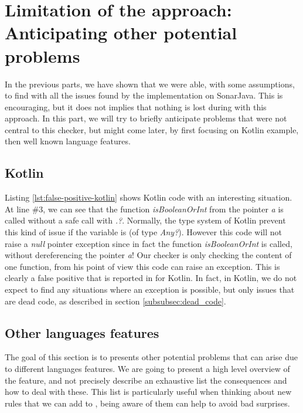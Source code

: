 \section{Limitation of the approach: Anticipating other potential problems}
\label{sec:anticipating_problems}

In the previous parts, we have shown that we were able, with some assumptions, to find with \slang{} all the issues found by the implementation on SonarJava. 
This is encouraging, but it does not implies that nothing is lost during with this approach.
In this part, we will try to briefly anticipate problems that were not central to this checker, but might come later, by first focusing on Kotlin example, then well known language features.

\subsection{Kotlin}
\label{subsec:kotlin}



Listing \ref{lst:false-positive-kotlin} shows Kotlin code with an interesting situation. 
At line $\#3$, we can see that the function \emph{isBooleanOrInt} from the pointer \emph{a} is called without a safe call with \emph{.?}. 
Normally, the type system of Kotlin prevent this kind of issue if the variable is \nullable{} (of type \emph{Any?}). 
However this code will not raise a \emph{null} pointer exception since in fact the function \emph{isBooleanOrInt} is called, without dereferencing the pointer \emph{a}! 
Our checker is only checking the content of one function, from his point of view this code can raise an exception. 
This is clearly a false positive that is reported in for Kotlin. 
In fact, in Kotlin, we do not expect to find any situations where an exception is possible, but only issues that are dead code, as described in section \ref{subsubsec:dead_code}.

\subsection{Other languages features}
\label{subsec:other_language_features}

The goal of this section is to presents other potential problems that can arise due to different languages features. We are going to present a high level overview of the feature, and not precisely describe an exhaustive list the consequences and how to deal with these.
This list is particularly useful when thinking about new rules that we can add to \slang, being aware of them can help to avoid bad surprises.

